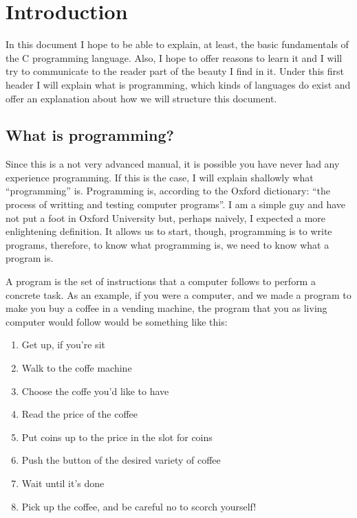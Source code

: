 \documentclass[a4paper]{article}
\begin{document}
\section{Introduction}
In this document I hope to be able to explain, at least, the basic fundamentals
of the C programming language. Also, I hope to offer reasons to learn it and
I will try to communicate to the reader part of the beauty I find in it.
Under this first header I will explain what is programming, which kinds
of languages do exist and offer an explanation about how we will structure this
document.

\label{section:queEsLaProgramacion}
\subsection{What is programming?}
Since this is a not very advanced manual, it is possible you have never had any
experience programming. If this is the case, I will explain shallowly what
``programming'' is. Programming is, according to the Oxford dictionary: ``the
process of writting and testing computer programs''. I am a simple guy and
have not put a foot in Oxford University but, perhaps naively, I expected a more
enlightening definition. It allows us to start, though, programming is to write
programs, therefore, to know what programming is, we need to know what a program
is.

A program is the set of instructions that a computer follows to perform a
concrete task. As an example, if you were a computer, and we made a program to
make you buy a coffee in a vending machine, the program that you as living
computer would follow would be something like this:

\begin{enumerate}
    \item Get up, if you're sit
    \item Walk to the coffe machine
    \item Choose the coffe you'd like to have
    \item Read the price of the coffee
    \item Put coins up to the price in the slot for coins
    \item Push the button of the desired variety of coffee
    \item Wait until it's done
    \item Pick up the coffee, and be careful no to scorch yourself!
\end{enumerate}
\end{document}

